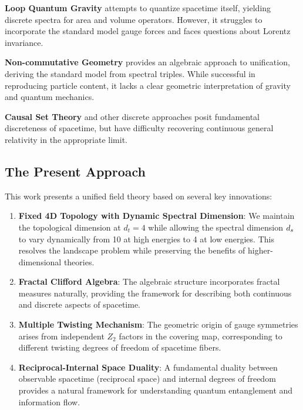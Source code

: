 \textbf{Loop Quantum Gravity} attempts to quantize spacetime itself, yielding discrete spectra for area and volume operators. However, it struggles to incorporate the standard model gauge forces and faces questions about Lorentz invariance.

\textbf{Non-commutative Geometry} provides an algebraic approach to unification, deriving the standard model from spectral triples. While successful in reproducing particle content, it lacks a clear geometric interpretation of gravity and quantum mechanics.

\textbf{Causal Set Theory} and other discrete approaches posit fundamental discreteness of spacetime, but have difficulty recovering continuous general relativity in the appropriate limit.

\subsection{The Present Approach}

This work presents a unified field theory based on several key innovations:

\begin{enumerate}
    \item \textbf{Fixed 4D Topology with Dynamic Spectral Dimension}: We maintain the topological dimension at $d_t = 4$ while allowing the spectral dimension $d_s$ to vary dynamically from 10 at high energies to 4 at low energies. This resolves the landscape problem while preserving the benefits of higher-dimensional theories.
    
    \item \textbf{Fractal Clifford Algebra}: The algebraic structure incorporates fractal measures naturally, providing the framework for describing both continuous and discrete aspects of spacetime.
    
    \item \textbf{Multiple Twisting Mechanism}: The geometric origin of gauge symmetries arises from independent $Z_2$ factors in the covering map, corresponding to different twisting degrees of freedom of spacetime fibers.
    
    \item \textbf{Reciprocal-Internal Space Duality}: A fundamental duality between observable spacetime (reciprocal space) and internal degrees of freedom provides a natural framework for understanding quantum entanglement and information flow.
\end{enumerate}

